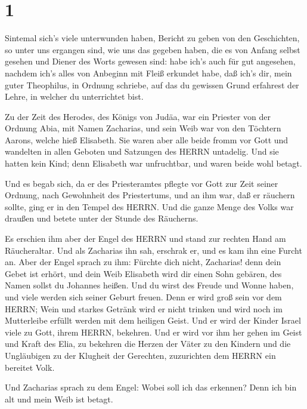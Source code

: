 \hypertarget{section}{%
\section{1}\label{section}}

 Sintemal sich's viele unterwunden haben, Bericht zu geben
von den Geschichten, so unter uns ergangen sind,  wie uns
das gegeben haben, die es von Anfang selbst gesehen und Diener des Worts
gewesen sind:  habe ich's auch für gut angesehen, nachdem
ich's alles von Anbeginn mit Fleiß erkundet habe, daß ich's dir, mein
guter Theophilus, in Ordnung schriebe,  auf das du gewissen
Grund erfahrest der Lehre, in welcher du unterrichtet bist.

 Zu der Zeit des Herodes, des Königs von Judäa, war ein
Priester von der Ordnung Abia, mit Namen Zacharias, und sein Weib war
von den Töchtern Aarons, welche hieß Elisabeth.  Sie waren
aber alle beide fromm vor Gott und wandelten in allen Geboten und
Satzungen des HERRN untadelig.  Und sie hatten kein Kind;
denn Elisabeth war unfruchtbar, und waren beide wohl betagt.

 Und es begab sich, da er des Priesteramtes pflegte vor Gott
zur Zeit seiner Ordnung,  nach Gewohnheit des Priestertums,
und an ihm war, daß er räuchern sollte, ging er in den Tempel des HERRN.
 Und die ganze Menge des Volks war draußen und betete unter
der Stunde des Räucherns.

 Es erschien ihm aber der Engel des HERRN und stand zur
rechten Hand am Räucheraltar.  Und als Zacharias ihn sah,
erschrak er, und es kam ihn eine Furcht an.  Aber der Engel
sprach zu ihm: Fürchte dich nicht, Zacharias! denn dein Gebet ist
erhört, und dein Weib Elisabeth wird dir einen Sohn gebären, des Namen
sollst du Johannes heißen.  Und du wirst des Freude und
Wonne haben, und viele werden sich seiner Geburt freuen. 
Denn er wird groß sein vor dem HERRN; Wein und starkes Getränk wird er
nicht trinken und wird noch im Mutterleibe erfüllt werden mit dem
heiligen Geist.  Und er wird der Kinder Israel viele zu
Gott, ihrem HERRN, bekehren.  Und er wird vor ihm her gehen
im Geist und Kraft des Elia, zu bekehren die Herzen der Väter zu den
Kindern und die Ungläubigen zu der Klugheit der Gerechten, zuzurichten
dem HERRN ein bereitet Volk.

 Und Zacharias sprach zu dem Engel: Wobei soll ich das
erkennen? Denn ich bin alt und mein Weib ist betagt.

